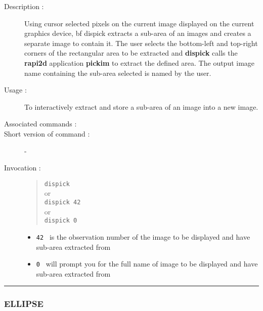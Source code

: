 \begin{description}

\item[Description :] Using cursor selected pixels on the current image
displayed on the current graphics device, {bf dispick} extracts a sub-area
of an images and creates a separate image to contain it.  The user
selects the bottom-left and top-right corners of the rectangular area
to be extracted and {\bf dispick} calls the {\bf rapi2d} application
{\bf pickim} to extract the defined area.  The output image name
containing the sub-area selected is named by the user.

\item[Usage :] To interactively extract and store a sub-area of an image
into a new image.
\item[Associated commands :] {\tt {}}
\item[Short version of command :] -
\item[Invocation :]

\begin{quote}{\tt  dispick }\\
or \\
{\tt dispick 42 }\\
or \\
{\tt dispick 0 }
\end{quote}

\begin{itemize}
\item {\tt 42 } is the observation number of the image to be displayed
and have sub-area extracted from
\item {\tt 0 } will prompt you for the full name of image to be displayed
and have sub-area extracted from
\end{itemize}

\end{description}

\hrule
\subsubsection*{\label{ELLIPSE}ELLIPSE}

